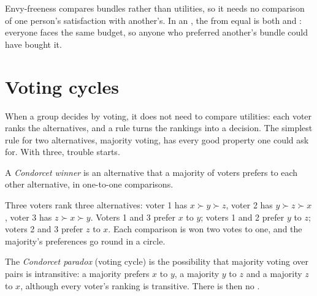 \begin{remark}
Envy-freeness compares bundles rather than utilities, so it needs no comparison of one person's
satisfaction with another's. In an , the  from equal  is
both  and : everyone faces the same budget, so anyone who preferred another's
bundle could have bought it.
\end{remark}

\section{Voting cycles}\label{sec:b2:social-choice:cycles}

When a group decides by voting, it does not need to compare utilities: each voter ranks the
alternatives, and a rule turns the rankings into a decision. The simplest rule for two alternatives,
majority voting, has every good property one could ask for. With three, trouble starts.

\begin{definition}\label{def:b2:social-choice:condorcet-winner}
A \emph{Condorcet winner} is an alternative that a majority of voters prefers to
each other alternative, in one-to-one comparisons.
\end{definition}

Three voters rank three alternatives: voter 1 has $x \succ y \succ z$, voter 2 has $y \succ z \succ x$,
voter 3 has $z \succ x \succ y$. Voters 1 and 3 prefer $x$ to $y$; voters 1 and 2 prefer $y$ to $z$;
voters 2 and 3 prefer $z$ to $x$. Each comparison is won two votes to one, and the majority's preferences go
round in a circle.

\begin{definition}\label{def:b2:social-choice:condorcet-paradox}
The \emph{Condorcet paradox} (voting cycle) is the possibility that majority
voting over pairs is intransitive: a majority prefers $x$ to $y$, a majority $y$ to $z$ and a majority $z$
to $x$, although every voter's ranking is transitive. There is then no .
\end{definition}


